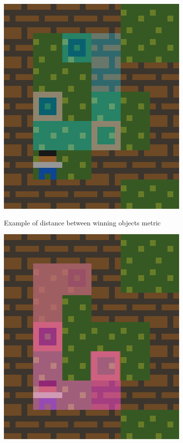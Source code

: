 \begin{hcfigure}
	\centering
	\begin{minipage}{0.45\textwidth}
		\centering
  		\includegraphics[width=\linewidth]{Images/firstScoreBestFS}
  		\caption{Example of distance between winning objects metric}
  		\label{Figure:bestFS1}
	\end{minipage}\hfill
	\begin{minipage}{0.45\textwidth}
		\centering
  		\includegraphics[width=\linewidth]{Images/secondScoreBestFS}

\end{minipage}
\end{hcfigure}
